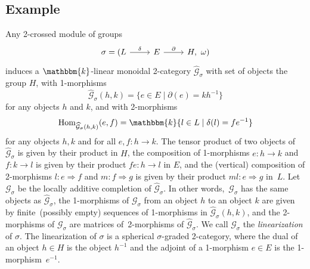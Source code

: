 \documentclass[a4paper, oneside]{amsart}
\numberwithin{equation}{subsection}
\theoremstyle{referencedlemma}
\theoremstyle{plain} %
\theoremstyle{remark}
\begin{document}
\subsection{Example}\label{Ex: graded 2-category associated to a 2-crossed module}
Any 2-crossed module of groups
$$
\begin{tikzcd}\sigma = (L\arrow[r, "\delta"] & E\arrow[r, "\partial"] & H, \ \omega)\end{tikzcd}
$$
induces a $\mathbbm{k}$-linear monoidal 2-category $\widehat{\mathcal{G}}_\sigma$ with set of objects the group $H$, with 1-morphisms
$$
\widehat{\mathcal{G}}_\sigma(h,k) = \{e\in E \mid \partial (e) = kh^{-1}\}
$$
for any objects $h$ and $k$, and with 2-morphisms
$$
\mathrm{Hom}_{\widehat{\mathcal{G}}_\sigma(h,k)}(e,f) = \mathbbm{k}\{l \in L \mid \delta( l) = fe^{-1}\}
$$
for any objects $h, k$ and for all $e,f \colon h \to k$.  The tensor product of two objects of $\widehat{\mathcal{G}}_\sigma$ is given by their product in $H$, the composition of 1-morphisms $e\colon h\to k$ and $f\colon k \to l$ is given by their product $fe\colon h\to l$ in $E$, and the (vertical) composition of 2-morphisms $l \colon e\Rightarrow f$ and $m\colon f\Rightarrow g$ is given by their product $ml\colon e\Rightarrow g$ in~$L$.  Let $\mathcal{G}_\sigma$ be the locally additive completion of $\widehat{\mathcal{G}}_\sigma$.  In other words,~$\mathcal{G}_\sigma$ has the same objects as $\widehat{\mathcal{G}}_\sigma$, the 1-morphisms of $\mathcal{G}_\sigma$ from an object $h$ to an object $k$ are given by finite~(possibly empty) sequences of 1-morphisms in $\widehat{\mathcal{G}}_\sigma(h,k)$, and the 2-morphisms of $\mathcal{G}_\sigma$ are matrices of~2-morphisms of $\widehat{\mathcal{G}}_\sigma$. We call $\mathcal{G}_\sigma$ the \emph{linearization} of $\sigma$. The linearization of $\sigma$ is a spherical $\sigma$-graded 2-category, where the dual of an object $h\in H$ is the object $h^{-1}$ and the adjoint of a 1-morphism $e\in E$ is the 1-morphism~$e^{-1}$. 
\end{document}
